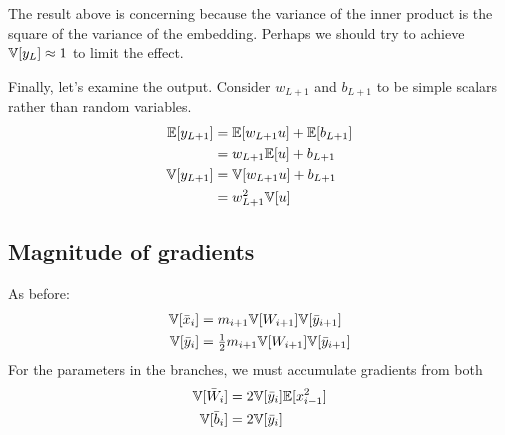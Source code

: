 The result above is concerning because the variance of the inner product is the square of the variance of the embedding.
Perhaps we should try to achieve $\mathbb{V}[y_{L}] \approx 1$ to limit the effect.

Finally, let's examine the output.
Consider $w_{L+1}$ and $b_{L+1}$ to be simple scalars rather than random variables.
\begin{align}
\mathbb{E}[y_{L+1}]
& = \mathbb{E}[w_{L+1} u] + \mathbb{E}[b_{L+1}] \\
& = w_{L+1} \mathbb{E}[u] + b_{L+1} \\
\mathbb{V}[y_{L+1}]
& = \mathbb{V}[w_{L+1} u] + b_{L+1} \\
& = w_{L+1}^2 \mathbb{V}[u]
\end{align}


\subsection{Magnitude of gradients}

As before:
\begin{align}
\mathbb{V}[\bar{x}_{i}] & = m_{i+1} \mathbb{V}[W_{i+1}] \mathbb{V}[\bar{y}_{i+1}] \\
\mathbb{V}[\bar{y}_{i}] & = \tfrac{1}{2} m_{i+1} \mathbb{V}[W_{i+1}] \mathbb{V}[\bar{y}_{i+1}]
\end{align}
For the parameters in the branches, we must accumulate gradients from both
\begin{align}
\mathbb{V}[\bar{W}_{i}] & = 2 \mathbb{V}[\bar{y}_{i}] \mathbb{E}[x_{i-1}^2] \\
\mathbb{V}[\bar{b}_{i}] & = 2 \mathbb{V}[\bar{y}_{i}]
\end{align}

